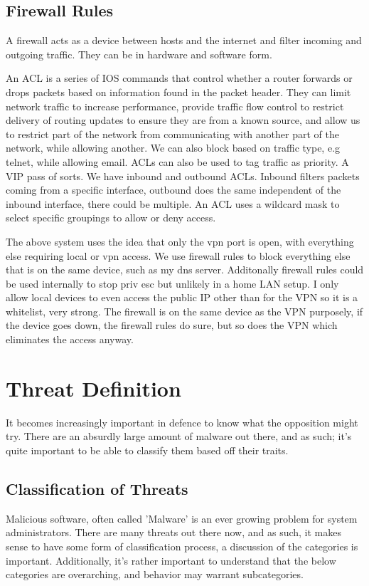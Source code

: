\subsection{Firewall Rules}
A firewall acts as a device between hosts and the internet and filter incoming and outgoing traffic. They can be in hardware and software form.

An ACL is a series of IOS commands that control whether a router forwards or drops packets based on information found in the packet header. They can limit network traffic to increase performance, provide traffic flow control to restrict delivery of routing updates to 
ensure they are from a known source, and allow us to restrict part of the network from communicating with another part of the network, while allowing another. We can also block based on traffic type, e.g telnet, while allowing email. ACLs can also be used to tag traffic as priority. 
A VIP pass of sorts. We have inbound and outbound ACLs. Inbound filters packets coming from a specific interface, outbound does the same independent of the inbound interface, there could be multiple. An ACL uses a wildcard mask to select specific groupings to allow or deny access.

The above system uses the idea that only the vpn port is open, with everything else requiring local or vpn access. We use firewall rules to block everything else that is on the same device, such as my dns server. Additonally firewall rules could be used internally to stop priv esc 
but unlikely in a home LAN setup. I only allow local devices to even access the public IP other than for the VPN so it is a whitelist, very strong. The firewall is on the same device as the VPN purposely, if the device goes down, the firewall rules do sure, but so does the VPN which eliminates the access anyway.


\section{Threat Definition}
It becomes increasingly important in defence to know what the opposition might try. There are an absurdly large amount of malware out there, and as such; it's quite important to be able to classify them based off their traits.

\subsection{Classification of Threats}
Malicious software, often called 'Malware' is an ever growing problem for system administrators. There are many threats out there now, and as such, it makes sense to have some form of classification process, a discussion of the categories is 
important. Additionally, it's rather important to understand that the below categories are overarching, and behavior may warrant subcategories. \citep{MalwareClass} 

